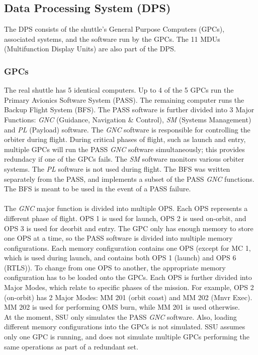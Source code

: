 \documentclass[Space_Shuttle_Ultra_Manual.tex]{subfiles}
\begin{document}
\subsection{Data Processing System (DPS)}
\begin{multicols*}{2}
\renewcommand{\cfttoctitlefont}{\bf}
\localtableofcontents
The DPS consists of the shuttle's General Purpose Computers (GPCs), associated systems, and the software run by the GPCs. The 11 MDUs (Multifunction Display Units) are also part of the DPS.
\subsubsection{GPCs}
The real shuttle has 5 identical computers. Up to 4 of the 5 GPCs run the Primary Avionics Software System (PASS). The remaining computer runs the Backup Flight System (BFS). The PASS software is further divided into 3 Major Functions: \textit{GNC} (Guidance, Navigation \& Control), \textit{SM} (Systems Management) and \textit{PL} (Payload) software. The \textit{GNC} software is responsible for controlling the orbiter during flight. During critical phases of flight, such as launch and entry, multiple GPCs will run the PASS \textit{GNC} software simultaneously; this provides redundacy if one of the GPCs fails. The \textit{SM} software monitors various orbiter systems. The \textit{PL} software is not used during flight. The BFS was written separately from the PASS, and implements a subset of the PASS \textit{GNC} functions. The BFS is meant to be used in the event of a PASS failure. \\
\\
The \textit{GNC} major function is divided into multiple OPS. Each OPS represents a different phase of flight. OPS 1 is used for launch, OPS 2 is used on-orbit, and OPS 3 is used for deorbit and entry. The GPC only has enough memory to store one OPS at a time, so the PASS software is divided into multiple memory configurations. Each memory configuration contains one OPS (except for MC 1, which is used during launch, and contains both OPS 1 (launch) and OPS 6 (RTLS)). To change from one OPS to another, the appropriate memory configuration has to be loaded onto the GPCs.
Each OPS is further divided into Major Modes, which relate to specific phases of the mission. For example, OPS 2 (on-orbit) has 2 Major Modes: MM 201 (orbit coast) and MM 202 (Mnvr Exec). MM 202 is used for performing OMS burn, while MM 201 is used otherwise.
\\
At the moment, SSU only simulates the PASS \textit{GNC} software. Also, loading different memory configurations into the GPCs is not simulated. SSU assumes only one GPC is running, and does not simulate multiple GPCs performing the same operations as part of a redundant set.

\end{multicols*}
\end{document}
